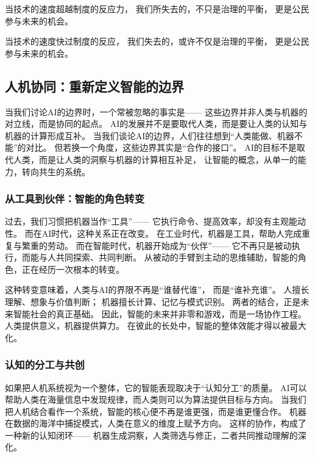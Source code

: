 \begin{center}
当技术的速度超越制度的反应力，  
我们所失去的，不只是治理的平衡，  
更是公民参与未来的机会。  
\end{center}
\begin{center}
当技术的速度快过制度的反应，  
我们失去的，或许不仅是治理的平衡，  
更是公民参与未来的机会。  
\end{center}

\subsection{人机协同：重新定义智能的边界}

当我们讨论AI的边界时，一个常被忽略的事实是——  
这些边界并非人类与机器的对立线，而是协同的起点。  
AI的发展并不是要取代人类，而是要让人类的认知与机器的计算形成互补。  
当我们谈论AI的边界，人们往往想到“人类能做、机器不能”的对比。  
但若换一个角度，这些边界其实是“合作的接口”。  
AI的目标不是取代人类，而是让人类的洞察与机器的计算相互补足，  
让智能的概念，从单一的能力，转向共生的系统。

\subsubsection{从工具到伙伴：智能的角色转变}

过去，我们习惯把机器当作“工具”——  
它执行命令、提高效率，却没有主观能动性。  
而在AI时代，这种关系正在改变。  
在工业时代，机器是工具，帮助人完成重复与繁重的劳动。  
而在智能时代，机器开始成为“伙伴”——  
它不再只是被动执行，而能与人共同探索、共同判断。  
从被动的手臂到主动的思维辅助，智能的角色，正在经历一次根本的转变。

这种转变意味着，人类与AI的界限不再是“谁替代谁”，  
而是“谁补充谁”。  
人擅长理解、想象与价值判断；  
机器擅长计算、记忆与模式识别。  
两者的结合，正是未来智能社会的真正基础。  
因此，智能的未来并非零和游戏，而是一场协作工程。  
人类提供意义，机器提供算力。  
在彼此的长处中，智能的整体效能才得以被最大化。

\subsubsection{认知的分工与共创}

如果把人机系统视为一个整体，它的智能表现取决于“认知分工”的质量。  
AI可以帮助人类在海量信息中发现规律，而人类则可以为算法提供目标与方向。  
当我们把人机结合看作一个系统，智能的核心便不再是谁更强，而是谁更懂合作。  
机器在数据的海洋中捕捉模式，人类在意义的维度上赋予方向。  
这样的协作，构成了一种新的认知闭环——  
机器生成洞察，人类筛选与修正，二者共同推动理解的深化。

